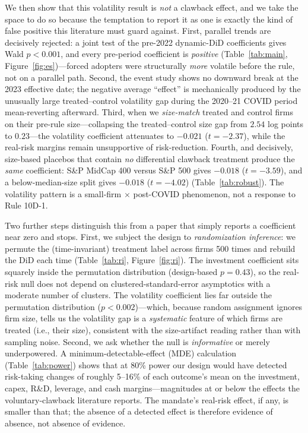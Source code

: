 \documentclass[12pt]{article}
\begin{document}
We then show that this volatility result is \emph{not} a clawback effect, and we take the space
to do so because the temptation to report it as one is exactly the kind of false positive this
literature must guard against. First, parallel trends are decisively rejected: a joint test of
the pre-2022 dynamic-DiD coefficients gives Wald $p<0.001$, and every pre-period coefficient is
\emph{positive} (Table~\ref{tab:main}, Figure~\ref{fig:es})---forced adopters were structurally
\emph{more} volatile before the rule, not on a parallel path. Second, the event study shows no
downward break at the 2023 effective date; the negative average ``effect'' is mechanically
produced by the unusually large treated--control volatility gap during the 2020--21 COVID period
mean-reverting afterward. Third, when we \emph{size-match} treated and control firms on their
pre-rule size---collapsing the treated--control size gap from $2.54$ log points to $0.23$---the
volatility coefficient attenuates to $-0.021$ ($t=-2.37$), while the real-risk margins remain
unsupportive of risk-reduction. Fourth, and decisively, size-based placebos that contain
\emph{no} differential clawback treatment produce the \emph{same} coefficient: S\&P MidCap 400
versus S\&P 500 gives $-0.018$ ($t=-3.59$), and a below-median-size split gives $-0.018$
($t=-4.02$) (Table~\ref{tab:robust}). The volatility pattern is a small-firm $\times$ post-COVID
phenomenon, not a response to Rule 10D-1.

Two further steps distinguish this from a paper that simply reports a coefficient near zero and
stops. First, we subject the design to \emph{randomization inference}: we permute the
(time-invariant) treatment label across firms 500 times and rebuild the DiD each time
(Table~\ref{tab:ri}, Figure~\ref{fig:ri}). The investment coefficient sits squarely inside the
permutation distribution (design-based $p=0.43$), so the real-risk null does not depend on
clustered-standard-error asymptotics with a moderate number of clusters. The volatility
coefficient lies far outside the permutation distribution ($p<0.002$)---which, because random
assignment ignores firm size, tells us the volatility gap is a \emph{systematic} feature of
which firms are treated (i.e., their size), consistent with the size-artifact reading rather
than with sampling noise. Second, we ask whether the null is \emph{informative} or merely
underpowered. A minimum-detectable-effect (MDE) calculation (Table~\ref{tab:power}) shows that
at 80\% power our design would have detected risk-taking changes of roughly 5--16\% of each
outcome's mean on the investment, capex, R\&D, leverage, and cash margins---magnitudes at or
below the effects the voluntary-clawback literature reports. The mandate's real-risk effect, if
any, is smaller than that; the absence of a detected effect is therefore evidence of absence,
not absence of evidence.
\end{document}
